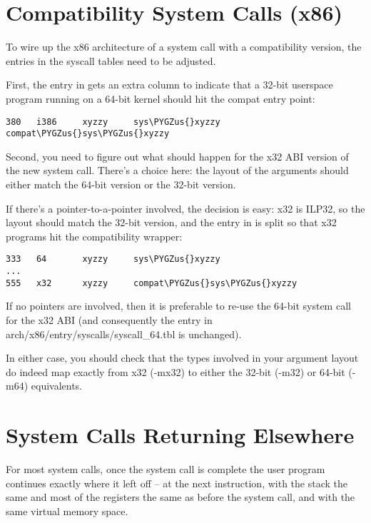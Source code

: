\documentclass[a4paper,8pt,english]{sphinxmanual}
\def\PYGZus{\char`\_}
\begin{document}
\section{Compatibility System Calls (x86)}
\label{process/adding-syscalls:compatibility-system-calls-x86}
To wire up the x86 architecture of a system call with a compatibility version,
the entries in the syscall tables need to be adjusted.

First, the entry in  gets an extra
column to indicate that a 32-bit userspace program running on a 64-bit kernel
should hit the compat entry point:

\begin{Verbatim}[commandchars=\\\{\}]
380   i386     xyzzy     sys\PYGZus{}xyzzy    compat\PYGZus{}sys\PYGZus{}xyzzy
\end{Verbatim}

Second, you need to figure out what should happen for the x32 ABI version of
the new system call.  There's a choice here: the layout of the arguments
should either match the 64-bit version or the 32-bit version.

If there's a pointer-to-a-pointer involved, the decision is easy: x32 is
ILP32, so the layout should match the 32-bit version, and the entry in
 is split so that x32 programs hit
the compatibility wrapper:

\begin{Verbatim}[commandchars=\\\{\}]
333   64       xyzzy     sys\PYGZus{}xyzzy
...
555   x32      xyzzy     compat\PYGZus{}sys\PYGZus{}xyzzy
\end{Verbatim}

If no pointers are involved, then it is preferable to re-use the 64-bit system
call for the x32 ABI (and consequently the entry in
arch/x86/entry/syscalls/syscall\_64.tbl is unchanged).

In either case, you should check that the types involved in your argument
layout do indeed map exactly from x32 (-mx32) to either the 32-bit (-m32) or
64-bit (-m64) equivalents.


\section{System Calls Returning Elsewhere}
\label{process/adding-syscalls:system-calls-returning-elsewhere}
For most system calls, once the system call is complete the user program
continues exactly where it left off -- at the next instruction, with the
stack the same and most of the registers the same as before the system call,
and with the same virtual memory space.
\end{document}

